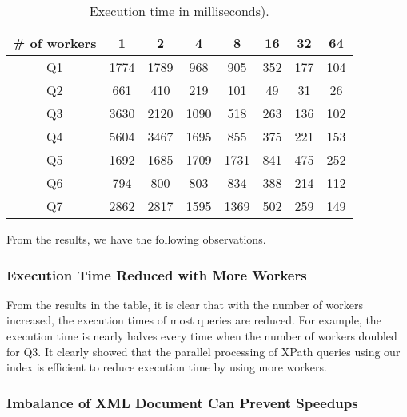 \begin{table*}[ht]
	\centering
	\caption{Execution time in milliseconds).}
	\label{tab:exetimes}
	\begin{tabular}{|c|c|c|c|c|c|c|c|}
		\hline
		\# of workers & 1       & 2       & 4       & 8       & 16      & 32      & 64      \\ \hline
		Q1                & 1774    & 1789    & 968     & 905     & 352     & 177     & 104 \\ \hline
		Q2                & 661     & 410     & 219     & 101     &  49     & 31      & 26 \\ \hline
		Q3                & 3630    & 2120    & 1090    & 518     & 263     & 136     & 102 \\ \hline
		Q4                & 5604    & 3467    & 1695    & 855     & 375     & 221     & 153 \\ \hline
		Q5                & 1692    & 1685    & 1709    & 1731    & 841     & 475     & 252 \\ \hline
		Q6                & 794     & 800     & 803     & 834     & 388     & 214     & 112 \\ \hline
		Q7                & 2862    & 2817    & 1595    & 1369    & 502     & 259     & 149 \\ \hline
	\end{tabular}
\end{table*}

From the results, we have the following observations.

\subsubsection{Execution Time Reduced with More Workers}

From the results in the table, it is clear that with the number of workers
increased, the execution times of most queries are reduced. For
example, the execution time is nearly halves every time when the number of
workers doubled for Q3. It clearly showed that the parallel processing of
XPath queries using our index is efficient to reduce execution time by using 
more workers.

\subsubsection{Imbalance of XML Document Can Prevent Speedups}

